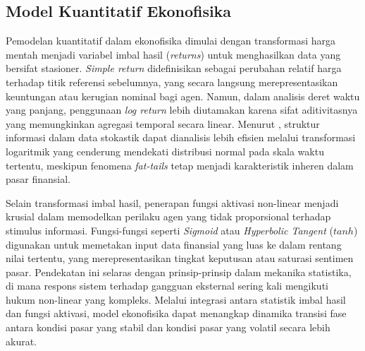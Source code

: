 \subsection{Model Kuantitatif Ekonofisika}

Pemodelan kuantitatif dalam ekonofisika dimulai dengan transformasi harga mentah menjadi variabel imbal hasil (\textit{returns}) untuk menghasilkan data yang bersifat stasioner. \textit{Simple return} didefinisikan sebagai perubahan relatif harga terhadap titik referensi sebelumnya, yang secara langsung merepresentasikan keuntungan atau kerugian nominal bagi agen. Namun, dalam analisis deret waktu yang panjang, penggunaan \textit{log return} lebih diutamakan karena sifat aditivitasnya yang memungkinkan agregasi temporal secara linear. Menurut \cite{kolmogorov_1968}, struktur informasi dalam data stokastik dapat dianalisis lebih efisien melalui transformasi logaritmik yang cenderung mendekati distribusi normal pada skala waktu tertentu, meskipun fenomena \textit{fat-tails} tetap menjadi karakteristik inheren dalam pasar finansial.

Selain transformasi imbal hasil, penerapan fungsi aktivasi non-linear menjadi krusial dalam memodelkan perilaku agen yang tidak proporsional terhadap stimulus informasi. Fungsi-fungsi seperti \textit{Sigmoid} atau \textit{Hyperbolic Tangent} ($tanh$) digunakan untuk memetakan input data finansial yang luas ke dalam rentang nilai tertentu, yang merepresentasikan tingkat keputusan atau saturasi sentimen pasar. Pendekatan ini selaras dengan prinsip-prinsip dalam mekanika statistika, di mana respons sistem terhadap gangguan eksternal sering kali mengikuti hukum non-linear yang kompleks. Melalui integrasi antara statistik imbal hasil dan fungsi aktivasi, model ekonofisika dapat menangkap dinamika transisi fase antara kondisi pasar yang stabil dan kondisi pasar yang volatil secara lebih akurat.

